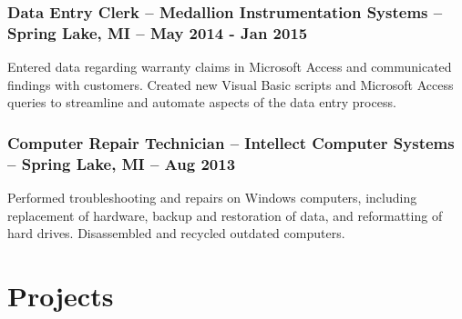 \documentclass{article}
\begin{document}
		\subsubsection{Data Entry Clerk -- Medallion Instrumentation Systems -- Spring Lake, MI -- May 2014 - Jan 2015}
			\begin{addmargin}[1em]{0em}
				Entered data regarding warranty claims in Microsoft Access and communicated findings with customers. Created new Visual Basic scripts and Microsoft Access queries to streamline and automate aspects of the data entry process.
			\end{addmargin}

		\subsubsection{Computer Repair Technician -- Intellect Computer Systems -- Spring Lake, MI -- Aug 2013}
			\begin{addmargin}[1em]{0em}
				Performed troubleshooting and repairs on Windows computers, including replacement of hardware, backup and restoration of data, and reformatting of hard drives. Disassembled and recycled outdated computers.
			\end{addmargin}



	\section*{Projects}
\end{document}
